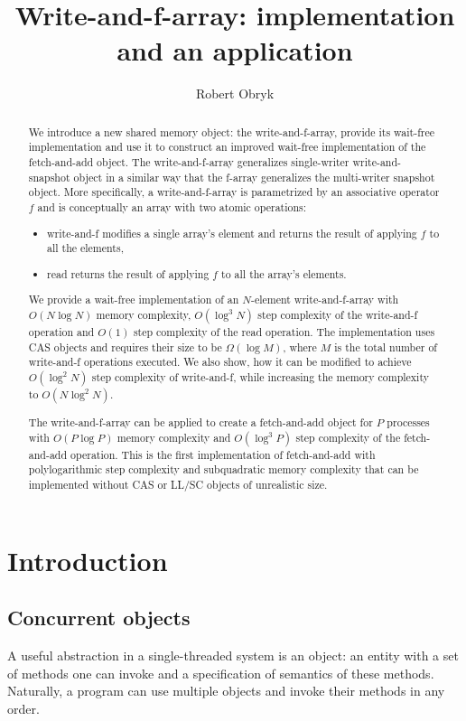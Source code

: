 \documentclass[a4paper,11pt]{article}
\author{Robert Obryk}
\title{Write-and-f-array: implementation and an application}
\date{}
\begin{document}
\maketitle
\begin{abstract}
	We introduce a new shared memory object: the write-and-f-array, provide its wait-free implementation and use it to construct an improved wait-free implementation of the fetch-and-add object. The write-and-f-array generalizes single-writer write-and-snapshot\cite{write-and-snap} object in a similar way that the f-array\cite{f-array} generalizes the multi-writer snapshot object. More specifically, a write-and-f-array is parametrized by an associative operator $f$ and is conceptually an array with two atomic operations:

\begin{itemize}
\item write-and-f modifies a single array's element and returns the result of applying $f$ to all the elements,
\item read returns the result of applying $f$ to all the array's elements.
\end{itemize}

We provide a wait-free implementation of an $N$-element write-and-f-array with $O(N \log N)$ memory complexity, $O(\log^3 N)$ step complexity of the write-and-f operation and $O(1)$ step complexity of the read operation. The implementation uses CAS objects and requires their size to be $\Omega(\log M)$, where $M$ is the total number of write-and-f operations executed. We also show, how it can be modified to achieve $O(\log^2 N)$ step complexity of write-and-f, while increasing the memory complexity to $O(N \log^2 N)$.

The write-and-f-array can be applied to create a fetch-and-add object for $P$ processes with $O(P \log P)$ memory complexity and $O(\log^3 P)$ step complexity of the fetch-and-add operation. This is the first implementation of fetch-and-add with polylogarithmic step complexity and subquadratic memory complexity that can be implemented without CAS or LL/SC objects of unrealistic size\cite{ellen-fai}.
\end{abstract}
\clearpage
\section{Introduction}

\subsection{Concurrent objects}
A useful abstraction in a single-threaded system is an object: an entity with a set of methods one can invoke
and a specification of semantics of these methods. Naturally, a program can use multiple objects and invoke
their methods in any order.
\end{document}
